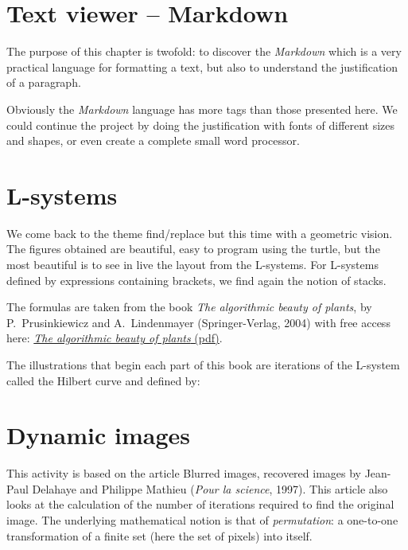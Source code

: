 \documentclass[11pt,class=report,crop=false]{standalone}
\begin{document}
\section{Text viewer -- Markdown}

The purpose of this chapter is twofold: to discover the \emph{Markdown} which is a very practical language for formatting a text, but also to understand the justification of a paragraph.

Obviously the \emph{Markdown} language has more tags than those presented here. We could continue the project by doing the justification with fonts of different sizes and shapes, or even create a complete small word processor.


\section{L-systems}

We come back to the theme \og{}find/replace\fg{} but this time with a geometric vision. The figures obtained are beautiful, easy to program using the turtle, but the most beautiful is to see in live the layout from the L-systems.
For L-systems defined by expressions containing brackets, we find again the notion of stacks. 

The formulas are taken from the book \emph{The algorithmic beauty of plants}, by 
P.~Prusinkiewicz and A.~Lindenmayer (Springer-Verlag, 2004) with free access here:
\href{http://algorithmicbotany.org/papers/abop/abop.pdf}{\emph{The algorithmic beauty of plants} (pdf)}.

The illustrations that begin each part of this book are iterations of the L-system called the Hilbert curve and defined by:


\section{Dynamic images}


This activity is based on the article \og{}Blurred images, recovered images\fg{} by Jean-Paul Delahaye and Philippe Mathieu (\emph{Pour la science}, 1997). This article also looks at the calculation of the number of iterations required to find the original image. The underlying mathematical notion is that of \emph{permutation}: a one-to-one transformation of a finite set (here the set of pixels) into itself.
\end{document}
